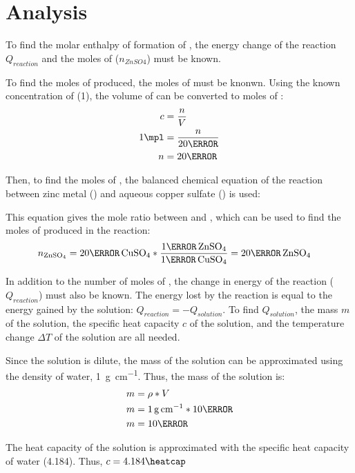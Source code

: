 \documentclass[12pt, notitlepage, letterpaper]{report}
\begin{document}
\section*{Analysis}

To find the molar enthalpy of formation of , the energy change of the reaction $Q_{reaction}$ and the moles of  ($n_{ZnSO4}$) must be known.

To find the moles of  produced, the moles of  must be knonwn. Using the known concentration of  (1\mpl), the volume of  can be converted to moles of :
\begin{align*}
	c     & = \frac{n}{V}     \\
	1\mpl & = \frac{n}{20\ml} \\
	n     & = 20\mmol
\end{align*}

Then, to find the moles of , the balanced chemical equation of the reaction between zinc metal () and aqueous copper sulfate () is used:

\centerline{}

This equation gives the mole ratio between  and , which can be used to find the moles of  produced in the reaction:
\begin{align*}
	n_{\ce{ZnSO4}} & = 20\mmol\,\ce{CuSO4} * \frac{1\mol\,{\ce{ZnSO4}}}{1\mol\,{\ce{CuSO4}}} = 20\mmol\,{\ce{ZnSO4}}
\end{align*}

In addition to the number of moles of , the change in energy of the reaction ($Q_{reaction}$) must also be known. The energy lost by the reaction is equal to the energy gained by the solution: $Q_{reaction} = -Q_{solution}$. To find $Q_{solution}$, the mass $m$ of the solution, the specific heat capacity $c$ of the solution, and the temperature change $\Delta T$ of the solution are all needed.

Since the solution is dilute, the mass of the solution can be approximated using the density of water, 1~\unit{\gram\per\cm}. Thus, the mass of the solution is:
\begin{align*}
	m & = \rho * V                       \\
	m & = 1\,\unit{\gram\per\cm} * 10\ml \\
	m & = 10\gram
\end{align*}

The heat capacity of the solution is approximated with the specific heat capacity of water (4.184\heatcap). Thus, $c = 4.184\heatcap$
\end{document}
